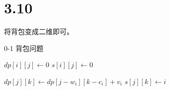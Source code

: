 \section*{3.10}

将背包变成二维即可。

\begin{algorithm}[!htbp]
  \caption{0-1 背包问题}
  \begin{algorithmic}[1]
        \State $dp[i][j] \gets 0$
        \State $s[i][j] \gets 0$
      \EndFor
    \EndFor

            \State $dp[j][k] \gets dp[j - w_i][k - c_i] + v_i$
            \State $s[j][k] \gets i$
          \EndIf
        \EndFor
      \EndFor
    \EndFor
  \EndProcedure
  \end{algorithmic}
\end{algorithm}
